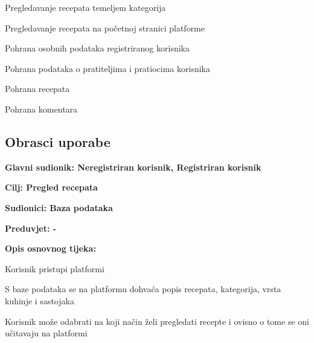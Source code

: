 \begin{packed_enum}
\begin{packed_enum}
				\end{packed_enum}
				
				\item  {}
				
				\begin{packed_enum}
					
					\item Pregledavanje recepata temeljem kategorija
					\item Pregledavanje recepata na početnoj stranici platforme
					
				\end{packed_enum}
				
				
				\item  {}
				
				\begin{packed_enum}
					
					\item Pohrana osobnih podataka registriranog korisnika
					\item Pohrana podataka o pratiteljima i pratiocima korisnika
					\item Pohrana recepata
					\item Pohrana komentara
					
				\end{packed_enum}
			\end{packed_enum}
			
			\eject 
				
			\subsection{Obrasci uporabe}
				
				
						\noindent {}
					\begin{packed_item}
						
						\item \textbf{Glavni sudionik: Neregistriran korisnik, Registriran korisnik}
						\item  \textbf{Cilj: Pregled recepata} 
						\item  \textbf{Sudionici: Baza podataka} 
						\item  \textbf{Preduvjet: -} 
						\item  \textbf{Opis osnovnog tijeka:}
						
						\item[] \begin{packed_enum}
							
							\item Korisnik pristupi platformi
							\item S baze podataka se na platformu dohvaća popis recepata, kategorija, vrsta kuhinje i sastojaka
							\item Korisnik može odabrati na koji način želi pregledati recepte i ovisno o tome se oni učitavaju na platformi
						\end{packed_enum}
						
					\end{packed_item}
					
